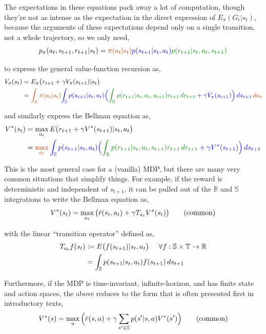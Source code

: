 The expectations in these equations pack away a lot of computation, though they're not as intense as the expectation in the direct expression of $E_\pi(G_t|s_t)$, because the arguments of these expectations depend only on a single transition, not a whole trajectory, so we only need,
\begin{equation*}
p_\pi(a_t, s_{t+1}, r_{t+1}|s_t) = \orange{\pi(a_t|s_t)} \blue{p(s_{t+1}|s_t,a_t)} \green{p(r_{t+1}|s_t,a_t,s_{t+1})}
\end{equation*}

to express the general value-function recursion as,
\begin{align*}
V_\pi(s_t) &= E_\pi\big{(}r_{t+1} + \gamma V_{\pi}(s_{t+1}) | s_t\big{)}\\
&= \orange{\int_{\mathbb{A}} \pi(a_t|s_t) \blue{\int_{\mathbb{S}} p(s_{t+1}|s_t,a_t) \Big{(}\green{\int_{\mathbb{R}}p(r_{t+1}|s_t,a_t,s_{t+1}) r_{t+1} \,dr_{t+1}} + \gamma V_{\pi}(s_{t+1}) \Big{)}\,ds_{t+1}}\,da_t}
\end{align*}

and similarly express the Bellman equation as,
\begin{align*}
V^*(s_t) &= \max_{a_t} E\big{(}r_{t+1} + \gamma V^*(s_{t+1}) | s_t, a_t\big{)}\\
&= \orange{\max_{a_t} \blue{\int_{\mathbb{S}} p(s_{t+1}|s_t,a_t) \Big{(}\green{\int_{\mathbb{R}} p(r_{t+1}|s_t,a_t,s_{t+1})r_{t+1} \,dr_{t+1}} + \gamma V^*(s_{t+1}) \Big{)}\,ds_{t+1}}}
\end{align*}

This is the most general case for a (vanilla) MDP, but there are many very common situations that simplify things. For example, if the reward is deterministic and independent of $s_{t+1}$, it can be pulled out of the $\mathbb{R}$ and $\mathbb{S}$ integrations to write the Bellman equation as,
\begin{equation*}
V^*(s_t) = \max_{a_t} \big{(} \bar{r}(s_t, a_t) + \gamma T_{a_t} V^*(s_t) \big{)} \tag{common}
\end{equation*}

with the linear ``transition operator'' defined as,
\begin{align*}
T_{a_t} f(s_t) &\coloneqq E\big{(}f(s_{t+1})|s_t,a_t\big{)}\ \ \ \ \forall f : \mathbb{S} \times \mathbb{T} \to \mathbb{R}\\
&= \int_{\mathbb{S}}p(s_{t+1}|s_t,a_t)f(s_{t+1})\,ds_{t+1}
\end{align*}

Furthermore, if the MDP is time-invariant, infinite-horizon, and has finite state and action spaces, the above reduces to the form that is often presented first in introductory texts,
\begin{equation*}
V^*(s) = \max_{a} \Big{(} \bar{r}(s, a) + \gamma \sum_{s' \in \mathbb{S}} p(s'|s,a) V^*(s') \Big{)} \tag{common}
\end{equation*}

